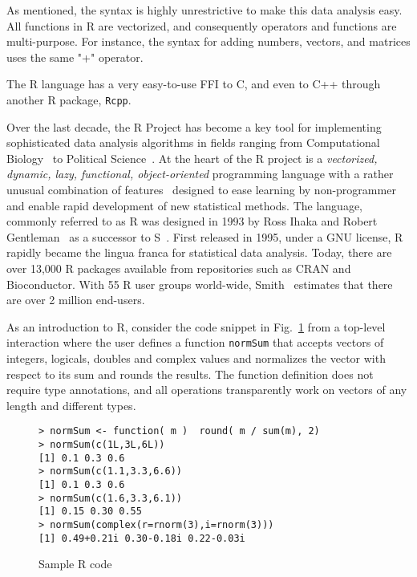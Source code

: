 \documentclass[acmsmall,10pt,review,anonymous]{acmart}\settopmatter{printfolios=true,printccs=false,printacmref=false}
\newcommand{\code}[1]{\lstinline|#1|\xspace}
\begin{document}
As mentioned, the syntax is highly unrestrictive to make this data analysis easy.
All functions in R are vectorized, and consequently operators and functions are multi-purpose.
For instance, the syntax for adding numbers, vectors, and matrices uses the same "+" operator.

The R language has a very easy-to-use FFI to C, and even to C++ through another R package, {\tt Rcpp}.


Over the last decade, the R Project has become a key tool for implementing
sophisticated data analysis algorithms in fields ranging from Computational
Biology~\cite{R05} to Political Science~\cite{R:Keele:2008}. At the heart of
the R project is a \emph{vectorized, dynamic, lazy, functional,
  object-oriented} programming language with a rather unusual combination of
features~\cite{ecoop12} designed to ease learning by non-programmer and
enable rapid development of new statistical methods.  The language, commonly
referred to as R was designed in 1993 by Ross Ihaka and Robert
Gentleman~\cite{R96} as a successor to S~\cite{S88}.  First released in
1995, under a GNU license, R rapidly became the lingua franca for
statistical data analysis. Today, there are over 13,000 R packages available
from repositories such as CRAN and Bioconductor.  With 55 R user groups
world-wide, Smith~\cite{eco11} estimates that there are over 2 million
end-users.


As an introduction to R, consider the code snippet in Fig.~\ref{sample} from
a top-level interaction where the user defines a function \code{normSum}
that accepts vectors of integers, logicals, doubles and complex values and
normalizes the vector with respect to its sum and rounds the results. The
function definition does not require type annotations, and all operations
transparently work on vectors of any length and different types.

\begin{figure}{\small
\begin{lstlisting}[style=R]
> normSum <- function( m )  round( m / sum(m), 2)
> normSum(c(1L,3L,6L))
[1] 0.1 0.3 0.6
> normSum(c(1.1,3.3,6.6))
[1] 0.1 0.3 0.6
> normSum(c(1.6,3.3,6.1))
[1] 0.15 0.30 0.55
> normSum(complex(r=rnorm(3),i=rnorm(3)))
[1] 0.49+0.21i 0.30-0.18i 0.22-0.03i
\end{lstlisting}}
\caption{Sample R code}\label{sample}
\end{figure}
\end{document}
